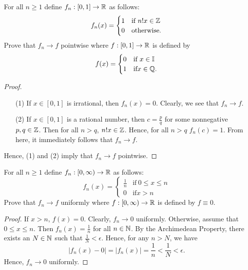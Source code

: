 \documentclass[a4paper]{article}
\begin{document}
\begin{problem}
    For all \( n \geq 1  \) define \( {f}_{n} : [0,1] \to \mathbb{R}  \) as follows:
    \[  {f}_{n}(x) = 
    \begin{cases}
        1 &\text{if} \ n!x \in \mathbb{Z} \\
        0 &\text{otherwise}. 
    \end{cases} \]
    Prove that \( {f}_{n} \to f  \) pointwise where \( f: [0,1] \to \mathbb{R}    \) is defined by 
    \[  f(x) = 
    \begin{cases}
        0 &\text{if} \ x \in \mathbb{I} \\
        1 &\text{if} x \in \mathbb{Q}.
    \end{cases} \]
\end{problem}
\begin{proof}
\begin{enumerate}
    \item[(1)] If \( x \in [0,1] \) is irrational, then \( {f}_{n}(x) = 0  \). Clearly, we see that \( {f}_{n} \to f  \).
        \item[(2)] If \( x \in [0,1] \) is a rational number, then \( c = \frac{ p }{ q }  \) for some nonnegative \( p,q \in \mathbb{Z}  \). Then for all \( n > q  \), \( n! x \in \mathbb{Z}  \).
            Hence, for all \( n > q  \) \( {f}_{n}(c) = 1  \). From here, it immediately follows that \( {f}_{n} \to f  \).
\end{enumerate}
Hence, (1) and (2) imply that \( {f}_{n} \to f  \) pointwise.
\end{proof}

\begin{problem}[i]
    For all \( n \geq 1  \) define \( {f}_{n} : [0,\infty) \to \mathbb{R}  \) as follows:
    \[  {f}_{n}(x) = 
    \begin{cases}
        \frac{ 1 }{ n }  &\text{if} \ 0 \leq x \leq n  \\
        0 &\text{if} x > n
    \end{cases} \]
    Prove that \( {f}_{n} \to f  \) uniformly where \( f:[0,\infty) \to  \mathbb{R}  \) is defined by \( f \equiv 0  \).
\end{problem}
\begin{proof}
If \( x > n  \), \( f(x) = 0  \). Clearly, \( {f}_{n} \to 0  \) uniformly. Otherwise, assume that \( 0 \leq x \leq n  \). Then \( {f}_{n}(x) = \frac{ 1 }{ n }  \) for all \( n \in \mathbb{N} \). By the Archimedean Property, there exists an \( N \in \mathbb{N} \) such that \( \frac{ 1 }{ N }  < \epsilon \). Hence, for any \( n >  N  \), we have 
\[  | {f}_{n}(x) - 0 |  = | {f}_{n}(x) |  = \frac{ 1 }{ n }  < \frac{ 1 }{ N }  < \epsilon. \]
Hence, \( {f}_{n} \to 0  \) uniformly.
\end{proof}
\end{document}
